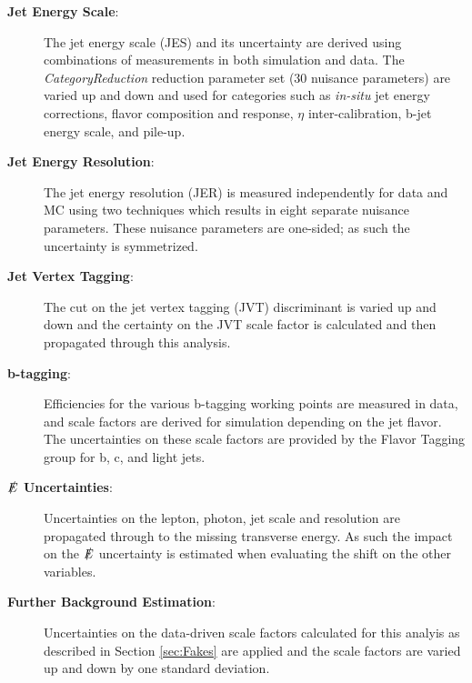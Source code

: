 \begin{description}
\item[\textbf{Jet Energy Scale}:] The jet energy scale (JES) and its uncertainty are derived using combinations of measurements in both simulation and data.  The \textit{CategoryReduction} reduction parameter set (30 nuisance parameters) are varied up and down and used for categories such as \textit{in-situ} jet energy corrections, flavor composition and response, $\eta$ inter-calibration, b-jet energy scale, and pile-up.

\item[\textbf{Jet Energy Resolution}:] The jet energy resolution (JER) is measured independently for data and MC using two techniques\cite{ATL-PHYS-PUB-2015-015} which results in eight separate nuisance parameters.  These nuisance parameters are one-sided; as such the uncertainty is symmetrized.


\item[\textbf{Jet Vertex Tagging}:]  The cut on the jet vertex tagging (JVT) discriminant is varied up and down \cite{JetJVT} and the certainty on the JVT scale factor is calculated and then propagated through this analysis.

\item[\textbf{b-tagging}:]  Efficiencies for the various b-tagging working points are measured in data, and scale factors are derived for simulation depending on the jet flavor.  The uncertainties on these scale factors are provided by the Flavor Tagging group for b, c, and light jets.

\item[\textbf{$\slashed{E}$ Uncertainties}:]  Uncertainties on the lepton, photon, jet scale and resolution are propagated through to the missing transverse energy.  As such the impact on the $\slashed{E}$ uncertainty is estimated when evaluating the shift on the other variables.

\item[\textbf{Further Background Estimation}:] Uncertainties on the data-driven scale factors calculated for this analyis as described in Section \ref{sec:Fakes} are applied and the scale factors are varied up and down by one standard deviation.

\end{description}

